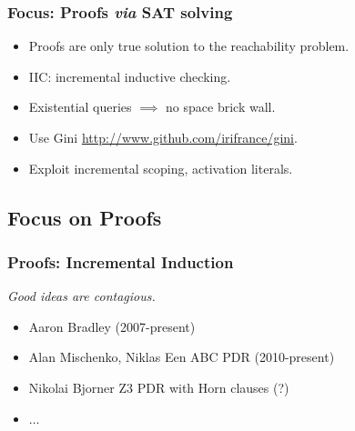 \documentclass{beamer}
\begin{document}
\begin{frame}
	\frametitle{Focus: Proofs {\em via} SAT solving}
	\begin{itemize}
		\item Proofs are only true solution to the reachability problem.
		\item IIC: incremental inductive checking.
		\item Existential queries $\implies$ no space brick wall.
		\item Use Gini \url{http://www.github.com/irifrance/gini}.
		\item Exploit incremental scoping, activation literals.
	\end{itemize}
\end{frame}


\subsection{Focus on Proofs}
\begin{frame}
	\frametitle{Proofs: Incremental Induction}
	\begin{center}
		\em{Good ideas are contagious.}
	\end{center}
	\begin{itemize}
		\item Aaron Bradley (2007-present)
		\item Alan Mischenko, Niklas Een ABC PDR (2010-present)
		\item Nikolai Bjorner Z3 PDR with Horn clauses (?)
		\item $\ldots$
	\end{itemize}
\end{frame}
\end{document}
